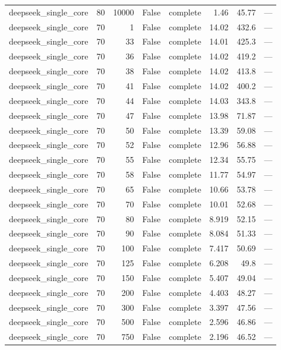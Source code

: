 \begin{tabular}{lrrrlrrl}
deepseek\_single\_core & 80 & 10000 & False & complete & 1.46 & 45.77 & — \\
deepseek\_single\_core & 70 & 1 & False & complete & 14.02 & 432.6 & — \\
deepseek\_single\_core & 70 & 33 & False & complete & 14.01 & 425.3 & — \\
deepseek\_single\_core & 70 & 36 & False & complete & 14.02 & 419.2 & — \\
deepseek\_single\_core & 70 & 38 & False & complete & 14.02 & 413.8 & — \\
deepseek\_single\_core & 70 & 41 & False & complete & 14.02 & 400.2 & — \\
deepseek\_single\_core & 70 & 44 & False & complete & 14.03 & 343.8 & — \\
deepseek\_single\_core & 70 & 47 & False & complete & 13.98 & 71.87 & — \\
deepseek\_single\_core & 70 & 50 & False & complete & 13.39 & 59.08 & — \\
deepseek\_single\_core & 70 & 52 & False & complete & 12.96 & 56.88 & — \\
deepseek\_single\_core & 70 & 55 & False & complete & 12.34 & 55.75 & — \\
deepseek\_single\_core & 70 & 58 & False & complete & 11.77 & 54.97 & — \\
deepseek\_single\_core & 70 & 65 & False & complete & 10.66 & 53.78 & — \\
deepseek\_single\_core & 70 & 70 & False & complete & 10.01 & 52.68 & — \\
deepseek\_single\_core & 70 & 80 & False & complete & 8.919 & 52.15 & — \\
deepseek\_single\_core & 70 & 90 & False & complete & 8.084 & 51.33 & — \\
deepseek\_single\_core & 70 & 100 & False & complete & 7.417 & 50.69 & — \\
deepseek\_single\_core & 70 & 125 & False & complete & 6.208 & 49.8 & — \\
deepseek\_single\_core & 70 & 150 & False & complete & 5.407 & 49.04 & — \\
deepseek\_single\_core & 70 & 200 & False & complete & 4.403 & 48.27 & — \\
deepseek\_single\_core & 70 & 300 & False & complete & 3.397 & 47.56 & — \\
deepseek\_single\_core & 70 & 500 & False & complete & 2.596 & 46.86 & — \\
deepseek\_single\_core & 70 & 750 & False & complete & 2.196 & 46.52 & — \\

\end{tabular}
